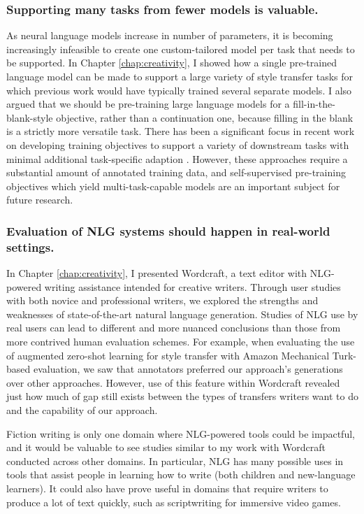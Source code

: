 \subsubsection{Supporting many tasks from fewer models is valuable.}
	As neural language models increase in number of parameters, it is becoming increasingly infeasible to create one custom-tailored model per task that needs to be supported.
	In Chapter \ref{chap:creativity}, I showed how a single pre-trained language model can be made to support a large variety of style transfer tasks for which previous work would have typically trained several separate models.
	I also argued that we should be pre-training large language models for a fill-in-the-blank-style objective, rather than a continuation one, because filling in the blank is a strictly more versatile task.
	There has been a significant focus in recent work on developing training objectives to support a variety of downstream tasks with minimal additional task-specific adaption \citep{wei2021finetuned,sanh2021multitask}.
	However, these approaches require a substantial amount of annotated training data, and self-supervised pre-training objectives which yield multi-task-capable models are an important subject for future research.

\subsubsection{Evaluation of NLG systems should happen in real-world settings.}
	In Chapter \ref{chap:creativity}, I presented Wordcraft, a text editor with NLG-powered writing assistance intended for creative writers.
	Through user studies with both novice and professional writers, we explored the strengths and weaknesses of state-of-the-art natural language generation.
	Studies of NLG use by real users can lead to different and more nuanced conclusions than those from more contrived human evaluation schemes.
	For example, when evaluating the use of augmented zero-shot learning for style transfer with Amazon Mechanical Turk-based evaluation, we saw that annotators preferred our approach's generations over other approaches.
	However, use of this feature within Wordcraft revealed just how much of gap still exists between the types of transfers writers want to do and the capability of our approach.

	Fiction writing is only one domain where NLG-powered tools could be impactful, and it would be valuable to see studies similar to my work with Wordcraft conducted across other domains.
	In particular, NLG has many possible uses in tools that assist people in learning how to write (both children and new-language learners).
	It could also have prove useful in domains that require writers to produce a lot of text quickly, such as scriptwriting for immersive video games.

